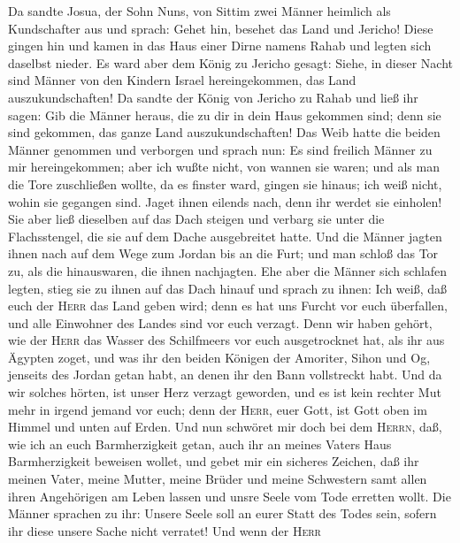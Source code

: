  Da sandte Josua, der Sohn Nuns, von Sittim zwei Männer
heimlich als Kundschafter aus und sprach: Gehet hin, besehet das Land
und Jericho! Diese gingen hin und kamen in das Haus einer Dirne namens
Rahab und legten sich daselbst nieder.  Es ward aber dem
König zu Jericho gesagt: Siehe, in dieser Nacht sind Männer von den
Kindern Israel hereingekommen, das Land auszukundschaften!
 Da sandte der König von Jericho zu Rahab und ließ ihr
sagen: Gib die Männer heraus, die zu dir in dein Haus gekommen sind;
denn sie sind gekommen, das ganze Land auszukundschaften! 
Das Weib hatte die beiden Männer genommen und verborgen und sprach nun:
Es sind freilich Männer zu mir hereingekommen; aber ich wußte nicht, von
wannen sie waren;  und als man die Tore zuschließen
wollte, da es finster ward, gingen sie hinaus; ich weiß nicht, wohin sie
gegangen sind. Jaget ihnen eilends nach, denn ihr werdet sie einholen!
 Sie aber ließ dieselben auf das Dach steigen und verbarg
sie unter die Flachsstengel, die sie auf dem Dache ausgebreitet hatte.
 Und die Männer jagten ihnen nach auf dem Wege zum Jordan
bis an die Furt; und man schloß das Tor zu, als die hinauswaren, die
ihnen nachjagten.  Ehe aber die Männer sich schlafen
legten, stieg sie zu ihnen auf das Dach hinauf  und sprach
zu ihnen: Ich weiß, daß euch der \textsc{Herr} das Land geben wird; denn
es hat uns Furcht vor euch überfallen, und alle Einwohner des Landes
sind vor euch verzagt.  Denn wir haben gehört, wie der
\textsc{Herr} das Wasser des Schilfmeers vor euch ausgetrocknet hat, als
ihr aus Ägypten zoget, und was ihr den beiden Königen der Amoriter,
Sihon und Og, jenseits des Jordan getan habt, an denen ihr den Bann
vollstreckt habt.  Und da wir solches hörten, ist unser
Herz verzagt geworden, und es ist kein rechter Mut mehr in irgend jemand
vor euch; denn der \textsc{Herr}, euer Gott, ist Gott oben im Himmel und
unten auf Erden.  Und nun schwöret mir doch bei dem
\textsc{Herrn}, daß, wie ich an euch Barmherzigkeit getan, auch ihr an
meines Vaters Haus Barmherzigkeit beweisen wollet, und gebet mir ein
sicheres Zeichen,  daß ihr meinen Vater, meine Mutter,
meine Brüder und meine Schwestern samt allen ihren Angehörigen am Leben
lassen und unsre Seele vom Tode erretten wollt.  Die
Männer sprachen zu ihr: Unsere Seele soll an eurer Statt des Todes sein,
sofern ihr diese unsere Sache nicht verratet! Und wenn der \textsc{Herr}
